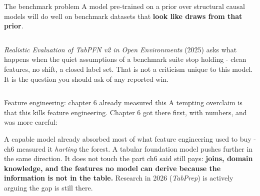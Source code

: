 \documentclass[aspectratio=169]{beamer}
\begin{document}
\begin{frame}{The benchmark problem}
  \small
  A model pre-trained on a prior over structural causal models will do well on benchmark
  datasets that \textbf{look like draws from that prior}.
  \vskip 8pt
  \begin{columns}[T]
    \footnotesize
    \emph{Realistic Evaluation of TabPFN v2 in Open Environments} (2025) asks what happens when
    the quiet assumptions of a benchmark suite stop holding - clean features, no shift, a closed
    label set.
    \vskip 5pt
    That is not a criticism unique to this model. It is the question you should ask of any
    reported win.
  \end{columns}
  \vskip 8pt
\end{frame}

\begin{frame}{Feature engineering: chapter 6 already measured this}
  \small
  A tempting overclaim is that this kills feature engineering. Chapter 6 got there first, with
  numbers, and was more careful:
  \vskip 6pt
  \begin{center}
  \end{center}
  \vskip 8pt
  \footnotesize
  A capable model already absorbed most of what feature engineering used to buy - ch6 measured
  it \emph{hurting} the forest. A tabular foundation model pushes further in the same direction.
  \vskip 5pt
  It does not touch the part ch6 said still pays: \textbf{joins, domain knowledge, and the
  features no model can derive because the information is not in the table.} Research in 2026
  (\emph{TabPrep}) is actively arguing the gap is still there.
\end{frame}
\end{document}
